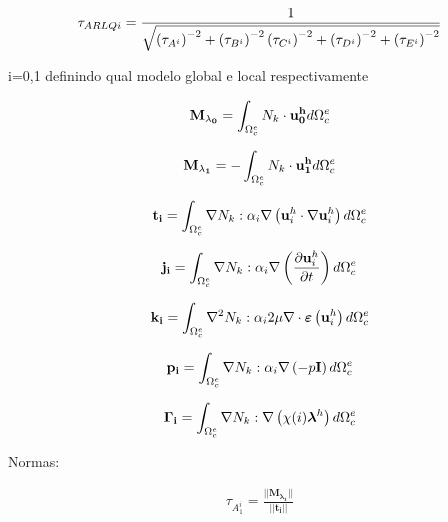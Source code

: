 \documentclass[tese_patricia]{subfiles}
\begin{document}
\begin{align}
	\tau_{ARLQi} = \frac{1}{\sqrt{ \left(\tau_{A^{i}}\right)^{-2} + \left(\tau_{B^{i}}\right)^{-2}   \left(\tau_{C^{i}}\right)^{-2} + \left(\tau_{D^{i}}\right)^{-2} + \left(\tau_{E^{i}}\right)^{-2}}}
\end{align}

i=0,1 definindo qual modelo global e local respectivamente

\begin{align}
	\mathbf{M_{\lambda_0}} = \int_{\Omega_{c}^{e}} N_{k} \cdot \mathbf{u_{0}^{h}} d\Omega_{c}^{e}
\end{align}

\begin{align}
	\mathbf{M_{\lambda_1}} = - \int_{\Omega_{c}^{e}} N_{k} \cdot \mathbf{u_{1}^{h}} d\Omega_{c}^{e}
\end{align}

\begin{align}
	\mathbf{t_{i}} = \int_{\Omega_{c}^{e}} \nabla N_{k} : \alpha_{i} \nabla \left( \mathbf{u}_i^{h} \cdot  \nabla \mathbf{u}_i^{h} \right)  d\Omega_{c}^{e}
\end{align}

\begin{align}
	\mathbf{j_{i}} = \int_{\Omega_{c}^{e}} \nabla N_{k} :  \alpha_{i} \nabla \left(\frac{\partial\mathbf{u}_i^{h}}{\partial t}  \right)  d\Omega_{c}^{e}
\end{align}

\begin{align}
	\mathbf{k_{i}} = \int_{\Omega_{c}^{e}} \nabla^{2} N_{k} : \alpha_{i} 2 \mu \nabla \cdot \bm{\varepsilon} \left(\mathbf{u}_i^{h}\right)    d\Omega_{c}^{e}
\end{align}

\begin{align}
	\mathbf{p_{i}} = \int_{\Omega_{c}^{e}} \nabla N_{k} : \alpha_{i} \nabla \left(-p\mathbf{I}\right)    d\Omega_{c}^{e}
\end{align}

\begin{align}
	\mathbf{\Gamma_{i}} = \int_{\Omega_{c}^{e}} \nabla N_{k} : \nabla \left(\chi (i) \boldsymbol{\lambda}^h\right)    d\Omega_{c}^{e}
\end{align}

Normas:

\begin{align}
	\tau_{A_1^{i}} = \frac{|| \mathbf{M_{\lambda_1}} || }{||\mathbf{t_{i}} ||} 
\end{align}
\end{document}
